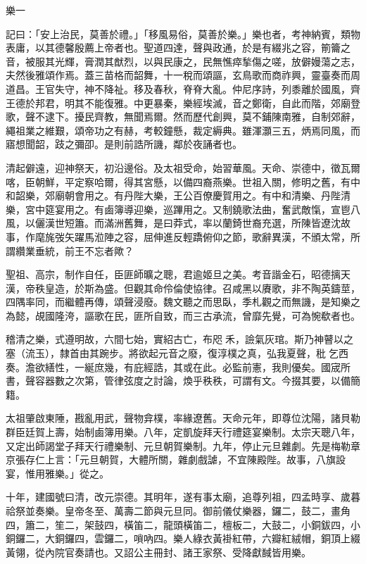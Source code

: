 
\begin{pinyinscope}
樂一

記曰：「安上治民，莫善於禮。」「移風易俗，莫善於樂。」樂也者，考神納賓，類物表庸，以其德馨殷薦上帝者也。聖道四達，聲與政通，於是有綴兆之容，箾籥之音，被服其光輝，膏潤其猷烈，以與民康之，民無憔瘁揫傷之嗟，放僻嫚蕩之志，夫然後雅頌作焉。蓋三苗格而韶舞，十一稅而頌謳，玄鳥歌而商祚興，靈臺奏而周道昌。王官失守，神不降祉。移及春秋，脊脊大亂。仲尼序詩，列黍離於國風，齊王德於邦君，明其不能復雅。中更暴秦，樂經埃滅，音之鄭衛，自此而階，郊廟登歌，聲不逮下。擾民齊教，無聞焉爾。然而歷代創興，莫不鋪陳南雅，自制郊辭，繩祖業之維艱，頌帝功之有赫，考較鐘懸，裁定縟典。雖渾灝三五，炳焉同風，而寤想聞韶，跂之彌卲。是則前誥所譏，鄰於夜誦者也。

清起僻遠，迎神祭天，初沿邊俗。及太祖受命，始習華風。天命、崇德中，徵瓦爾喀，臣朝鮮，平定察哈爾，得其宮懸，以備四裔燕樂。世祖入關，修明之舊，有中和韶樂，郊廟朝會用之。有丹陛大樂，王公百僚慶賀用之。有中和清樂、丹陛清樂，宮中筵宴用之。有鹵簿導迎樂，巡蹕用之。又制鐃歌法曲，奮武敵愾，宣鬯八風，以儷漢世短簫。而滿洲舊舞，是曰莽式，率以蘭錡世裔充選，所陳皆遼沈故事，作麾旄弢矢躍馬涖陣之容，屈伸進反輕蹻俯仰之節，歌辭異漢，不頒太常，所謂纘業垂統，前王不忘者歟？

聖祖、高宗，制作自任，臣匪師曠之聰，君逾姬旦之美。考音諧金石，昭德摛天漢，帝秩皇造，於斯為盛。但觀其命伶倫使協律。召咸黑以賡歌，非不陶英鑄莖，四隅率同，而繼體再傳，頌聲浸廢。魏文聽之而思臥，季札觀之而無譏，是知樂之為懿，覘國隆洿，謳歌在民，匪所自致，而三古承流，曾靡先覺，可為惋欷者也。

稽清之樂，式遵明故，六間七始，實紹古亡，布咫𦾑禾，譣氣灰琯。斯乃神瞽以之塞（流玉），隸首由其踠步。將欲起元音之廢，復淳樸之真，弘我夏聲，秕乞西奏。澹欲繕性，一綖庶幾，有庇經誥，其或在此。必監前憲，我則優矣。國宬所書，聲容器數之次第，管律弦度之討論，煥乎秩秩，可謂有文。今掇其要，以備簡籍。

太祖肇啟東陲，戡亂用武，聲物弇樸，率緣遼舊。天命元年，即尊位沈陽，諸貝勒群臣廷賀上壽，始制鹵簿用樂。八年，定凱旋拜天行禮筵宴樂制。太宗天聰八年，又定出師謁堂子拜天行禮樂制、元旦朝賀樂制。九年，停止元旦雜劇。先是梅勒章京張存仁上言：「元旦朝賀，大體所關，雜劇戲謔，不宜陳殿陛。故事，八旗設宴，惟用雅樂。」從之。

十年，建國號曰清，改元崇德。其明年，遂有事太廟，追尊列祖，四孟時享、歲暮祫祭並奏樂。皇帝冬至、萬壽二節與元旦同。御前儀仗樂器，鑼二，鼓二，畫角四，簫二，笙二，架鼓四，橫笛二，龍頭橫笛二，檀板二，大鼓二，小銅鈸四，小銅鑼二，大銅鑼四，雲鑼二，嗩吶四。樂人綠衣黃褂紅帶，六瓣紅絨帽，銅頂上綴黃翎，從內院官奏請也。又詔公主冊封、諸王家祭、受降獻馘皆用樂。


\end{pinyinscope}
